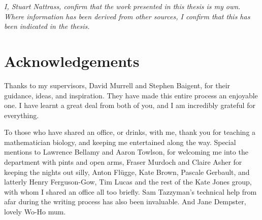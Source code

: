 \documentclass[a4paper]{report}
\begin{document}
\pagestyle{fancy}
\renewcommand{\chaptermark}[1]{%
\markboth{\MakeUppercase{%
\chaptername\ \thechapter.%
\ #1}}{}}
\fancyhead{}
\fancyhead[R]{\leftmark}




\newpage

\vspace*{\fill}

\begin{centering}

\textit{I, Stuart Nattrass, confirm that the work presented in this thesis is my own. Where information has been derived from other sources, I confirm that this has been indicated in the thesis.}

\end{centering}

\vspace*{\fill}


\newpage






\newpage


\doublespacing

\chapter*{Acknowledgements}

Thanks to my supervisors, David Murrell and Stephen Baigent, for their guidance, ideas, and inspiration. They have made this entire process an enjoyable one. I have learnt a great deal from both of you, and I am incredibly grateful for everything.

To those who have shared an office, or drinks, with me, thank you for teaching a mathematician biology, and keeping me entertained along the way. Special mentions to Lawrence Bellamy and Aaron Towlson, for welcoming me into the department with pints and open arms, Fraser Murdoch and Claire Asher for keeping the nights out silly, Anton Fl\"{u}gge, Kate Brown, Pascale Gerbault, and latterly Henry Ferguson-Gow, Tim Lucas and the rest of the Kate Jones group, with whom I shared an office all too briefly. Sam Tazzyman's technical help from afar during the writing process has also been invaluable. And Jane Dempster, lovely Wo-Ho mum.
\end{document}
